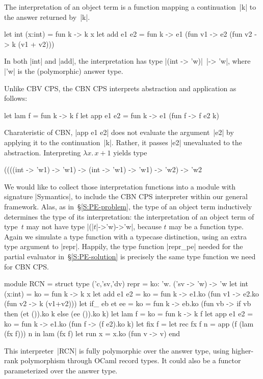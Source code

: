 \documentclass[preprint]{sigplanconf}
\newcommand{\fun}[1]{\mathopen{\lambda\mathord{#1}.\,}}
\begin{document}
The interpretation of an object term is a function
mapping a continuation~|k| to the answer
returned by~|k|.
\begin{code}
let int (x:int) = fun k -> k x
let add e1 e2 = fun k ->
  e1 (fun v1 -> e2 (fun v2 -> k (v1 + v2)))
\end{code}
In both |int| and |add|, the interpretation has type 
|(int -> 'w)|\texttt{ }|-> 'w|, where |'w| is the (polymorphic) answer type.

Unlike CBV CPS, the CBN CPS interprets
abstraction and application as follows:
\begin{code}
let lam f = fun k -> k f
let app e1 e2 = fun k -> e1 (fun f -> f e2 k)
\end{code}
Charateristic of CBN, |app e1 e2|
does not evaluate the argument~|e2| by applying it to the
continuation~|k|. Rather, it passes |e2| unevaluated to the abstraction.
Interpreting $\fun{x} x+1$ yields type
\begin{code}
((((int -> 'w1) -> 'w1) -> (int -> 'w1) -> 'w1)
 -> 'w2) -> 'w2
\end{code}

We would like to collect those interpretation functions into a module
with signature |Symantics|, to include the CBN CPS interpreter within our
general framework. Alas, as in~\S\ref{S:PE-problem}, the type of
an object term inductively determines the type of its interpretation:
the interpretation of an object term of type~$t$ may not have type
|(|$t$|->'w)->'w|, because $t$ may be a function type.  Again we
simulate a type function with a typecase distinction, using an extra
type argument to |repr|. Happily, the type function |repr_pe| needed for
the partial evaluator 
in~\S\ref{S:PE-solution} is precisely the same type function we
need for CBN CPS\@.
\begin{code}
module RCN = struct
  type ('c,'sv,'dv) repr = 
    {ko: 'w. ('sv -> 'w) -> 'w}
  let int (x:int) = {ko = fun k -> k x}
  let add e1 e2 = 
    {ko = fun k -> e1.ko (fun v1 -> 
                   e2.ko (fun v2 -> k (v1+v2)))}
  let if_ eb et ee = 
    {ko = fun k -> eb.ko 
         (fun vb -> if vb then (et ()).ko k 
                          else (ee ()).ko k)}
  let lam f = {ko = fun k -> k f}
  let app e1 e2 = 
    {ko = fun k -> e1.ko (fun f -> (f e2).ko k)}
  let fix f = 
    let rec fx f n = app (f (lam (fx f))) n in 
    lam (fx f)
  let run x = x.ko (fun v -> v)
end
\end{code}

This interpreter~|RCN| is fully polymorphic over the answer type,
using higher-rank polymorphism through OCaml record types.
It could also be a functor parameterized over
the answer type.
\end{document}
